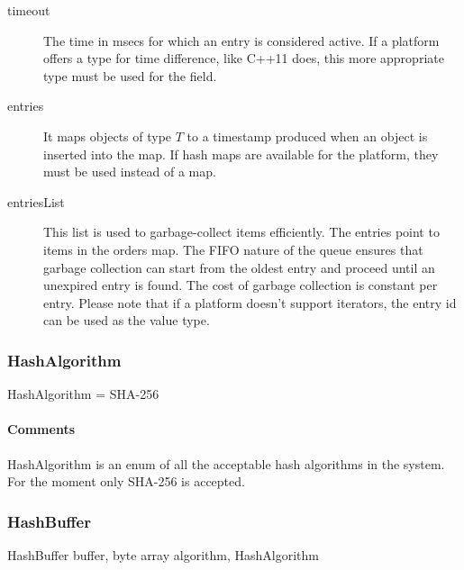 \documentclass[a4paper,10pt]{article}
\begin{document}
\SpecialItem
\begin{description}
 \item[timeout] The time in msecs for which an entry is considered active. If a platform offers a type for time difference, like C++11 does, this more appropriate type must be 
used for the field.
 \item[entries] It maps objects of type $T$ to a timestamp produced when an object is inserted into the map. If hash maps are available for the platform, they must be used instead 
of a map.
 \item[entriesList] This list is used to garbage-collect items efficiently. The entries point to items in the orders map. The FIFO nature of the queue ensures that garbage 
collection can start from the oldest entry and proceed until an unexpired entry is found. The cost of garbage collection is constant per entry. Please note that if a platform 
doesn't support iterators, the entry id can be used as the value type.
\end{description}

\subsubsection{HashAlgorithm}

\begin{verbbox}
HashAlgorithm = { SHA-256 }
\end{verbbox}
\begin{center}
\theverbbox
\end{center}

\begin{inparaitem}[ ]
 \item \infrastructure
\end{inparaitem}

\paragraph*{Comments}
HashAlgorithm is an enum of all the acceptable hash algorithms in the system. For the moment only SHA-256 is accepted.

\subsubsection{HashBuffer}

\begin{verbbox}
HashBuffer
{
  buffer, byte array
  algorithm, HashAlgorithm
}
\end{verbbox}
\begin{center}
\theverbbox
\end{center}
\end{document}

